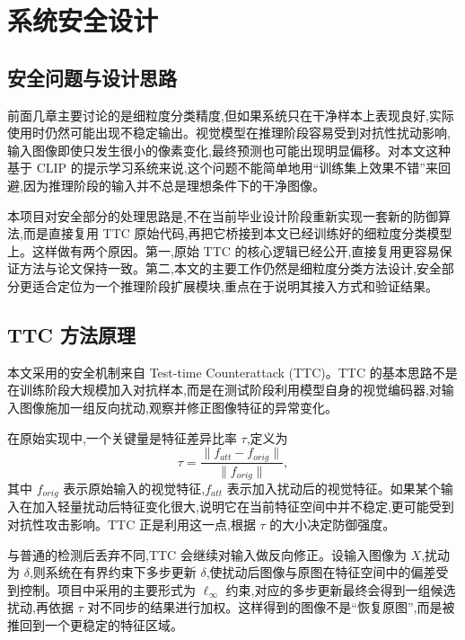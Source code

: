 \chapter{系统安全设计}

\section{安全问题与设计思路}

前面几章主要讨论的是细粒度分类精度,但如果系统只在干净样本上表现良好,实际使用时仍然可能出现不稳定输出。视觉模型在推理阶段容易受到对抗性扰动影响,输入图像即使只发生很小的像素变化,最终预测也可能出现明显偏移。对本文这种基于 CLIP 的提示学习系统来说,这个问题不能简单地用“训练集上效果不错”来回避,因为推理阶段的输入并不总是理想条件下的干净图像。

本项目对安全部分的处理思路是,不在当前毕业设计阶段重新实现一套新的防御算法,而是直接复用 TTC 原始代码,再把它桥接到本文已经训练好的细粒度分类模型上。这样做有两个原因。第一,原始 TTC 的核心逻辑已经公开,直接复用更容易保证方法与论文保持一致。第二,本文的主要工作仍然是细粒度分类方法设计,安全部分更适合定位为一个推理阶段扩展模块,重点在于说明其接入方式和验证结果。

\section{TTC 方法原理}

本文采用的安全机制来自 Test-time Counterattack (TTC)\cite{xing2025ttc}。TTC 的基本思路不是在训练阶段大规模加入对抗样本,而是在测试阶段利用模型自身的视觉编码器,对输入图像施加一组反向扰动,观察并修正图像特征的异常变化。

在原始实现中,一个关键量是特征差异比率 \(\tau\),定义为
\begin{equation}
\tau = \frac{\lVert f_{att} - f_{orig} \rVert}{\lVert f_{orig} \rVert},
\end{equation}
其中 \(f_{orig}\) 表示原始输入的视觉特征,\(f_{att}\) 表示加入扰动后的视觉特征。如果某个输入在加入轻量扰动后特征变化很大,说明它在当前特征空间中并不稳定,更可能受到对抗性攻击影响。TTC 正是利用这一点,根据 \(\tau\) 的大小决定防御强度。

与普通的检测后丢弃不同,TTC 会继续对输入做反向修正。设输入图像为 \(X\),扰动为 \(\delta\),则系统在有界约束下多步更新 \(\delta\),使扰动后图像与原图在特征空间中的偏差受到控制。项目中采用的主要形式为 \(\ell_{\infty}\) 约束,对应的多步更新最终会得到一组候选扰动,再依据 \(\tau\) 对不同步的结果进行加权。这样得到的图像不是“恢复原图”,而是被推回到一个更稳定的特征区域。

